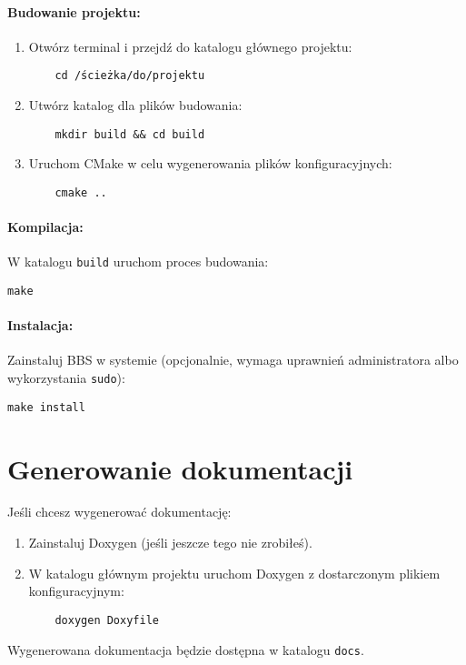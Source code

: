 \paragraph{Budowanie projektu:}
\begin{enumerate}
    \item Otwórz terminal i przejdź do katalogu głównego projektu:
    \begin{verbatim}
    cd /ścieżka/do/projektu
    \end{verbatim}
    \item Utwórz katalog dla plików budowania:
    \begin{verbatim}
    mkdir build && cd build
    \end{verbatim}
    \item Uruchom CMake w celu wygenerowania plików konfiguracyjnych:
    \begin{verbatim}
    cmake ..
    \end{verbatim}
\end{enumerate}

\paragraph{Kompilacja:} 
W katalogu \texttt{build} uruchom proces budowania:
\begin{verbatim}
make
\end{verbatim}

\paragraph{Instalacja:} 
Zainstaluj BBS w systemie (opcjonalnie, wymaga uprawnień administratora albo wykorzystania \texttt{sudo}):
\begin{verbatim}
make install
\end{verbatim}

\section{Generowanie dokumentacji}
Jeśli chcesz wygenerować dokumentację:
\begin{enumerate}
    \item Zainstaluj Doxygen (jeśli jeszcze tego nie zrobiłeś).
    \item W katalogu głównym projektu uruchom Doxygen z dostarczonym plikiem konfiguracyjnym:
    \begin{verbatim}
    doxygen Doxyfile
    \end{verbatim}
\end{enumerate}
Wygenerowana dokumentacja będzie dostępna w katalogu \texttt{docs}.

